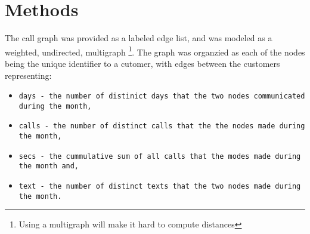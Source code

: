 \section{Methods}
The call graph was provided as a labeled edge list, and was modeled as a weighted, undirected, multigraph \footnote{Using a multigraph will make it hard to compute distances}.
The graph was organzied as each of the nodes being the unique identifier to a cutomer, with edges between the customers representing:
\begin{itemize}
	\item \tt{days} - the number of distinict days that the two nodes communicated during the month,
	\item \tt{calls} - the number of distinct calls that the the nodes made during the month,
	\item \tt{secs} - the cummulative sum of all calls that the modes made during the month and,
	\item \tt{text} - the number of distinct texts that the two nodes made during the month.
\end{itemize}

